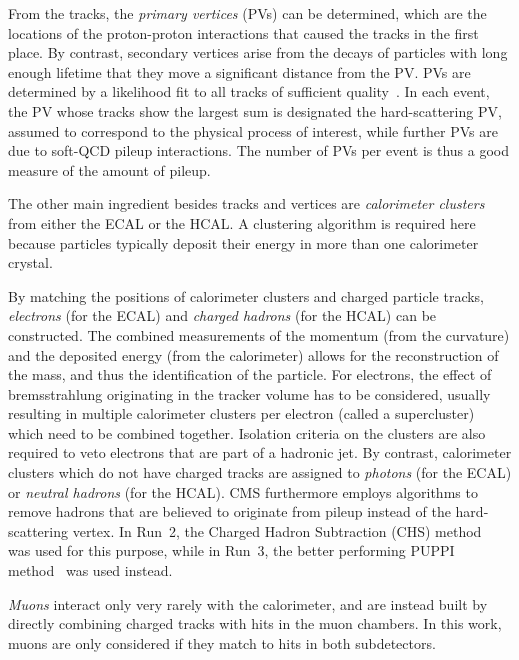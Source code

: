 From the tracks, the \textit{primary vertices} (PVs) can be determined, which are the locations of the proton-proton interactions that caused the tracks in the first place. By contrast, secondary vertices arise from the decays of particles with long enough lifetime that they move a significant distance from the PV. PVs are determined by a likelihood fit to all tracks of sufficient quality~\cite{CMS:2014pgm}. In each event, the PV whose tracks show the largest \pt sum is designated the hard-scattering PV, assumed to correspond to the physical process of interest, while further PVs are due to soft-QCD pileup interactions. The number of PVs per event is thus a good measure of the amount of pileup.
    
The other main ingredient besides tracks and vertices are \textit{calorimeter clusters} from either the ECAL or the HCAL. A clustering algorithm is required here because particles typically deposit their energy in more than one calorimeter crystal.

By matching the positions of calorimeter clusters and charged particle tracks, \textit{electrons} (for the ECAL) and \textit{charged hadrons} (for the HCAL) can be constructed. The combined measurements of the momentum (from the curvature) and the deposited energy (from the calorimeter) allows for the reconstruction of the mass, and thus the identification of the particle.
For electrons, the effect of bremsstrahlung originating in the tracker volume has to be considered, usually resulting in multiple calorimeter clusters per electron (called a supercluster) which need to be combined together. Isolation criteria on the clusters are also required to veto electrons that are part of a hadronic jet. 
By contrast, calorimeter clusters which do not have charged tracks are assigned to \textit{photons} (for the ECAL) or \textit{neutral hadrons} (for the HCAL). 
CMS furthermore employs algorithms to remove hadrons that are believed to originate from pileup instead of the hard-scattering vertex. In Run~2, the Charged Hadron Subtraction (CHS) method~\cite{CMS:PRF-14-001} was used for this purpose, while in Run~3, the better performing PUPPI method~\cite{Bertolini:2014bba,CMS:2020ebo} was used instead.

\textit{Muons} interact only very rarely with the calorimeter, and are instead built by directly combining charged tracks with hits in the muon chambers. In this work, muons are only considered if they match to hits in both subdetectors.

